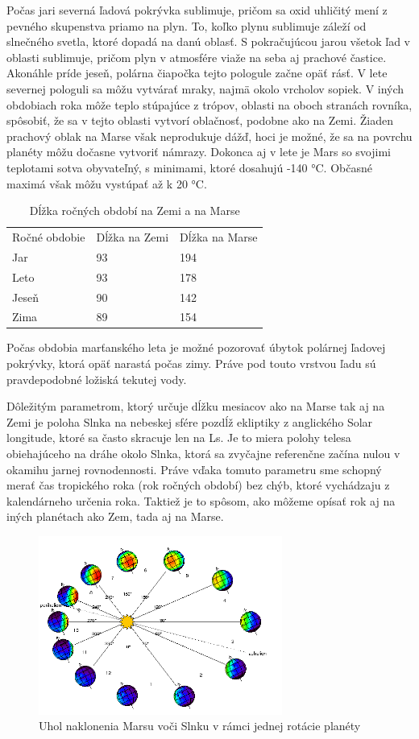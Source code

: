 \newline Počas jari severná ľadová pokrývka sublimuje, pričom sa oxid uhličitý mení z pevného skupenstva priamo na plyn. To, koľko plynu sublimuje záleží od slnečného svetla, ktoré dopadá na danú oblasť. S pokračujúcou jarou všetok ľad v oblasti sublimuje, pričom plyn v atmosfére viaže na seba aj prachové častice. Akonáhle príde jeseň, polárna čiapočka tejto pologule začne opäť rásť. V lete severnej pologuli sa môžu vytvárať mraky, najmä okolo vrcholov sopiek. V iných obdobiach roka môže teplo stúpajúce z trópov, oblasti na oboch stranách rovníka, spôsobiť, že sa v tejto oblasti vytvorí oblačnosť, podobne ako na Zemi. Žiaden prachový oblak na Marse však neprodukuje dážď, hoci je možné, že sa na povrchu planéty môžu dočasne vytvoriť námrazy. Dokonca aj v lete je Mars so svojimi teplotami sotva obyvateľný, s minimami, ktoré dosahujú -140 °C. Občasné maximá však môžu vystúpať až k 20 °C.

\begin{table}[!htbp]
\caption{Dĺžka ročných období na Zemi a na Marse}
\centering
\begin{tabular}{lll}
Ročné obdobie & Dĺžka na Zemi & Dĺžka na Marse  \\
Jar           & 93            & 194             \\
Leto          & 93            & 178             \\
Jeseň         & 90            & 142             \\
Zima          & 89            & 154            
\end{tabular}
\end{table}
Počas obdobia marťanského leta je možné pozorovať úbytok polárnej ľadovej pokrývky, ktorá opäť narastá počas zimy. Práve pod touto vrstvou ľadu sú pravdepodobné ložiská tekutej vody.

Dôležitým parametrom, ktorý určuje dĺžku mesiacov ako na Marse tak aj na Zemi je poloha Slnka na nebeskej sfére pozdĺž ekliptiky z anglického Solar longitude, ktoré sa často skracuje len na Ls. Je to miera polohy telesa obiehajúceho na dráhe okolo Slnka, ktorá sa zvyčajne referenčne začína nulou v okamihu jarnej rovnodennosti. Práve vďaka tomuto parametru sme schopný merať čas tropického roka (rok ročných období) bez chýb, ktoré vychádzaju z kalendárneho určenia roka. Taktiež je to spôsom, ako môžeme opísať rok aj na iných planétach ako Zem, tada aj na Marse.
\begin{figure}[!htbp]
  \centering
  \includegraphics[width=8cm]{img/orbit.png}
  \caption{Uhol naklonenia Marsu voči Slnku v rámci jednej rotácie planéty}
  \label{solarLS}
\end{figure}

